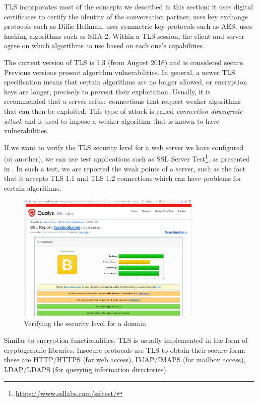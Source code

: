 TLS incorporates most of the concepts we described in this section: it uses digital certificates to certify the identity of the conversation partner, uses key exchange protocols such as Diffie-Hellman, uses symmetric key protocols such as AES, uses hashing algorithms such as SHA-2.
Within a TLS session, the client and server agree on which algorithms to use based on each one's capabilities.

The current version of TLS is 1.3 (from August 2018) and is considered secure.
Previous versions present algorithm vulnerabilities.
In general, a newer TLS specification means that certain algorithms are no longer allowed, or encryption keys are longer, precisely to prevent their exploitation.
Usually, it is recommended that a server refuse connections that request weaker algorithms that can then be exploited.
This type of attack is called \textit{connection downgrade attack} and is used to impose a weaker algorithm that is known to have vulnerabilities.

If we want to verify the TLS security level for a web server we have configured (or another), we can use test applications such as SSL Server Test\footnote{\url{https://www.ssllabs.com/ssltest/}}, as presented in .
In such a test, we are reported the weak points of a server, such as the fact that it accepts TLS 1.1 and TLS 1.2 connections which can have problems for certain algorithms.

\begin{figure}[!htbp]
  \centering
  \includegraphics[width=0.8\textwidth]{chapters/12-auth/img/ssllabs.png}
  \caption{Verifying the security level for a domain}
  \label{fig:sec:ssllabs}
\end{figure}

Similar to encryption functionalities, TLS is usually implemented in the form of cryptographic libraries.
Insecure protocols use TLS to obtain their secure form: these are HTTP/HTTPS (for web access), IMAP/IMAPS (for mailbox access), LDAP/LDAPS (for querying information directories).

